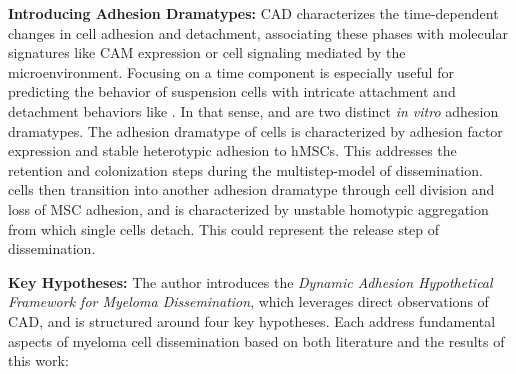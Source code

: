 \textbf{Introducing Adhesion Dramatypes:}
\acf{CAD} characterizes the time-dependent changes in cell
adhesion and detachment, associating these phases with molecular signatures like
\ac{CAM} expression or cell signaling mediated by the microenvironment. Focusing
on a time component is especially useful for predicting the behavior of
suspension cells with intricate attachment and detachment behaviors like \INA.
In that sense, \MAina and \nMAina are two distinct \textit{in vitro} adhesion
dramatypes. The adhesion dramatype of \MAina cells is characterized by adhesion
factor expression and stable heterotypic adhesion to \acp{hMSC}. This addresses
the retention and colonization steps during the multistep-model of
dissemination. \MAina cells then transition into another adhesion dramatype
\dashed{\nMAina} through cell division and loss of MSC adhesion, and is
characterized by unstable homotypic aggregation from which single cells detach.
This could represent the release step of dissemination.


\textbf{Key Hypotheses:}
The author introduces the \emph{Dynamic Adhesion Hypothetical Framework for
      Myeloma Dissemination}, which leverages direct observations of
\ac{CAD}, and is structured around four key hypotheses. Each
address fundamental aspects of myeloma cell dissemination based on both
literature and the results of this work:



\newcommand{\caddramatype}{ %
      \textbf{Myeloma cells change their adhesion dramatype during dissemination.}
      In response to different environmental cues faced during dissemination,
      myeloma cells switch, change or adapt their \ac{CAD}. These states are
      characterized by adhesion dramatpyes\footref{foot:adhesiondt}. Different
      steps in dissemination involve distinct adhesion dramatypes, or instance,
      one for specialized colonizing new sites and one specialized for vascular
      interactions. %
}%
\newcommand{\caddramatypetitle}{ %
      \textit{Hypothesis 1}: Cells Change their Adhesion Dramatype during Dissemination%
}%


\newcommand{\cadplasticity}{ %
      \textbf{Rapid \ac{CAD} plasticity drives aggressive dissemination in myeloma.}
      Dramatypic plasticity describes the overall repertoire of adhesion
      dramatypes\footref{foot:adhesiondt} that individual myeloma cells can
      deploy. However, such plasticity is limited by the rapidness of deploying
      a specialized adhesion dramatype during steps of dissemination.
}%
\newcommand{\cadplasticitytitle}{ %
      \textit{Hypothesis 2}: Rapid CAD Plasticity Drives Aggression in Myeloma %
}%



